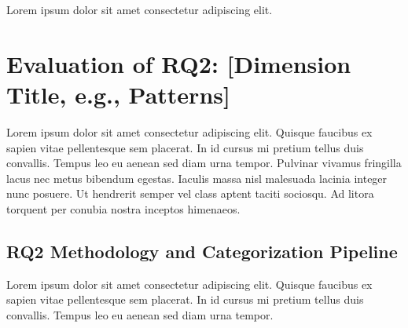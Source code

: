 \documentclass[sigconf,nonacm]{acmart} %
\begin{document}


Lorem ipsum dolor sit amet consectetur adipiscing elit.

\section{Evaluation of RQ2: [Dimension Title, e.g., Patterns]}
\label{sec:rq2_evaluation}

Lorem ipsum dolor sit amet consectetur adipiscing elit.
Quisque faucibus ex sapien vitae pellentesque sem placerat. 
In id cursus mi pretium tellus duis convallis.
Tempus leo eu aenean sed diam urna tempor. 
Pulvinar vivamus fringilla lacus nec metus bibendum egestas.
Iaculis massa nisl malesuada lacinia integer nunc posuere. 
Ut hendrerit semper vel class aptent taciti sociosqu. 
Ad litora torquent per conubia nostra inceptos himenaeos.

\subsection{RQ2 Methodology and Categorization Pipeline}
\label{subsec:rq2_methodology}


Lorem ipsum dolor sit amet consectetur adipiscing elit.
Quisque faucibus ex sapien vitae pellentesque sem placerat. 
In id cursus mi pretium tellus duis convallis. 
Tempus leo eu aenean sed diam urna tempor.
\end{document}
